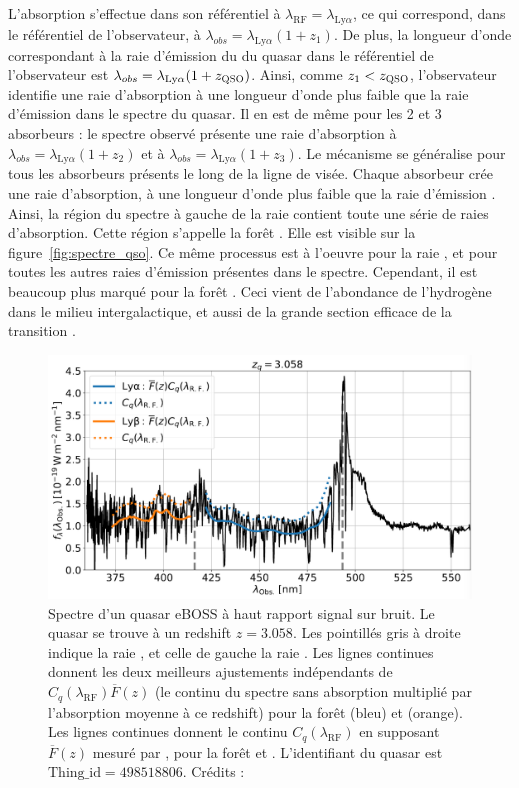 \documentclass[11pt, twoside, a4paper, openright]{report}
\begin{document}
L'absorption \lya{} s'effectue dans son référentiel à $\lambda_{\mathrm{RF}} = \lambda_{\mathrm{Ly}\alpha}$, ce qui correspond, dans le référentiel de l'observateur, à $\lambda_{obs} = \lambda_{\mathrm{Ly}\alpha} (1+z_{1})$. De plus, la longueur d'onde correspondant à la raie d'émission du \lya{} du quasar dans le référentiel de l'observateur est $\lambda_{obs} = \lambda_{\mathrm{Ly}\alpha} (1+z_{\textsc{QSO}})$. Ainsi, comme $z_1 < z_{\textsc{QSO}}$, l'observateur identifie une raie d'absorption à une longueur d'onde plus faible que la raie d'émission \lya{} dans le spectre du quasar. Il en est de même pour les 2 et 3 absorbeurs : le spectre observé présente une raie d'absorption à $\lambda_{obs} = \lambda_{\mathrm{Ly}\alpha} (1+z_{2})$ et à $\lambda_{obs} = \lambda_{\mathrm{Ly}\alpha} (1+z_{3})$. Le mécanisme se généralise pour tous les absorbeurs présents le long de la ligne de visée. Chaque absorbeur crée une raie d'absorption, à une longueur d'onde plus faible que la raie d'émission \lya{}. Ainsi, la région du spectre à gauche de la raie \lya{} contient toute une série de raies d'absorption. Cette région s'appelle la forêt \lya{}. Elle est visible sur la figure~\ref{fig:spectre_qso}. Ce même processus est à l'oeuvre pour la raie \lyb{}, et pour toutes les autres raies d'émission présentes dans le spectre.
Cependant, il est beaucoup plus marqué pour la forêt \lya{}. Ceci vient de l'abondance de l'hydrogène dans le milieu intergalactique, et aussi de la grande section efficace de la transition \lya{}.
\begin{figure}
  \centering
  \includegraphics[scale=0.35]{foret_lya}
  \caption{Spectre d'un quasar eBOSS à haut rapport signal sur bruit. Le quasar se trouve à un redshift $z=3.058$.
    Les pointillés gris à droite indique la raie \lya{}, et celle de gauche la raie \lyb{}.
    Les lignes continues donnent les deux meilleurs ajustements indépendants de $C_{q}(\lambda_{\mathrm{RF}})\overline F(z)$ (le continu du spectre sans absorption multiplié par l'absorption moyenne à ce redshift) pour la forêt \lya (bleu) et \lyb{} (orange).
    Les lignes continues donnent le continu $C_{q}(\lambda_{\mathrm{RF}})$ en supposant $\overline F(z)$ mesuré par \textcite{Calura2012}, pour la forêt \lya{} et \lyb{}. L'identifiant du quasar est $\mathrm{Thing\_id} = 498518806$.
  Crédits : \textcite{prov:LyaDR16}}
  \label{fig:foret_lya}
\end{figure}
\end{document}
